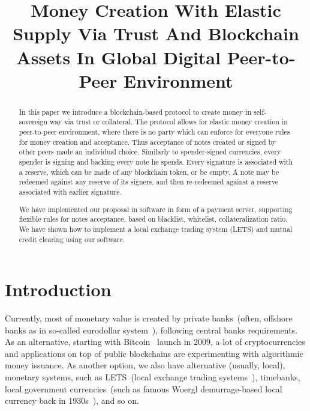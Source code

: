 \documentclass{llncs}   %
\begin{document}
\title{Money Creation With Elastic Supply Via Trust And Blockchain Assets In
Global Digital Peer-to-Peer Environment}



\maketitle

\begin{abstract}
In this paper we introduce a blockchain-based protocol to create money in self-sovereign way via trust or collateral. The
protocol allows for elastic money creation in peer-to-peer environment, where there is no party which can enforce for everyone
rules for money creation and acceptance. Thus acceptance of notes created or signed
by other peers made an individual choice. Similarly to spender-signed currencies, every spender is signing and backing every
note he spends. Every signature is associated with a reserve, which can be made of any blockchain token, or be empty. A note may
be redeemed against any reserve of its signers, and then re-redeemed against a reserve associated with earlier signature.

We have implemented our proposal in software in form of a payment server, supporting flexible rules for notes acceptance,
based on blacklist, whitelist, collateralization ratio. We have shown how to implement a local exchange trading system (LETS)
and mutual credit clearing using our software.
\end{abstract}

\section{Introduction}

Currently, most of monetary value is created by private banks~(often, offshore banks as in so-called eurodollar
system~\cite{machlup1970euro}), following central banks requirements. As an alternative, starting with
Bitcoin~\cite{nakamoto2008peer} launch in 2009, a lot of cryptocurrencies and applications on top of public
blockchains are experimenting with algorithmic money issuance. As another option, we also have alternative (usually, local),
monetary systems, such as LETS~(local exchange trading systems~\cite{williams1996new}), timebanks, local government
currencies~(such as famous Woergl demurrage-based local currency back in 1930s~\cite{unterguggenbercer1934end}), and so on.
\end{document}
